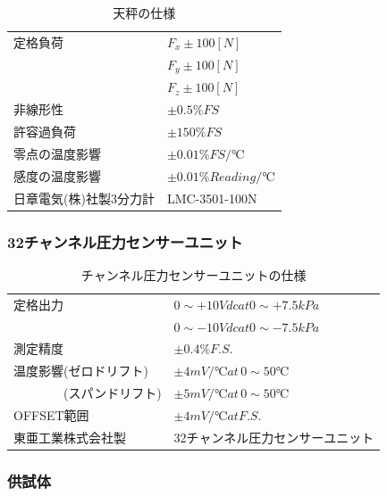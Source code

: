 \documentclass[a4j,twoside,openright,11pt]{jarticle}
\begin{document}
\begin{table}[htb]
\begin{center}
  \caption{天秤の仕様}
  \begin{tabular}{ll} \hline
定格負荷                &$F_x \pm 100[N]$\\
                        &$F_y \pm 100[N]$\\
                        &$F_z \pm 100[N]$\\
非線形性                &$\pm 0.5 \% FS$\\
許容過負荷              &$\pm 150 \% FS$\\
零点の温度影響          &$\pm 0.01 \% FS/℃ $\\
感度の温度影響          &$\pm 0.01 \% Reading/℃$\\
日章電気(株)社製3分力計 &LMC-3501-100N\\
\hline
  \end{tabular}
\end{center}
\end{table}

\newpage
\subsubsection{32チャンネル圧力センサーユニット}
\begin{table}[htbp]
\begin{center}
  \caption{チャンネル圧力センサーユニットの仕様}
  \begin{tabular}{ll} \hline
定格出力                &$0 \sim +10Vdc at 0 \sim +7.5 kPa$\\
                        &$0 \sim -10Vdc at 0 \sim -7.5 kPa$\\
測定精度                &$\pm0.4\%F.S.$\\
温度影響(ゼロドリフト)  &$\pm 4mV/℃ at \,0 \sim 50 ℃ $\\
\,\,\,\,\,\,\,\,\,\,\,\,\,\,\,\,\,\,\,\,\,\,\,\,(スパンドリフト)&$\pm 5mV/℃ at \,0 \sim 50 ℃ $\\
OFFSET範囲              &$\pm 4mV/℃  atF.S. $\\
東亜工業株式会社製      &32チャンネル圧力センサーユニット\\
\hline
  \end{tabular}
\end{center}
\end{table}

\subsubsection{供試体}
\end{document}
